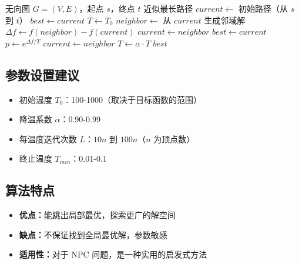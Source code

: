 \documentclass[UTF8,12pt,a4paper]{ctexart}
\begin{document}
\begin{algorithm}[H]
	\caption{模拟退火求解最长路径}
	\begin{algorithmic}[1]
		\Require 无向图 $G=(V,E)$，起点 $s$，终点 $t$
		\Ensure 近似最长路径
		\State $current \gets$ 初始路径（从 $s$ 到 $t$）
		\State $best \gets current$
		\State $T \gets T_0$ 
			 
				\State $neighbor \gets$ 从 $current$ 生成邻域解
					\State $\Delta f \gets f(neighbor) - f(current)$
					 
						\State $current \gets neighbor$
							\State $best \gets current$
						\EndIf
					\Else {}
						\State $p \gets e^{\Delta f / T}$
						 
							\State $current \gets neighbor$
						\EndIf
					\EndIf
				\EndIf
			\EndFor
			\State $T \gets \alpha \cdot T$ 
		\EndWhile
		\State \Return $best$
	\end{algorithmic}
\end{algorithm}

\subsection*{参数设置建议}

\begin{itemize}
	\item 初始温度 $T_0$：100-1000（取决于目标函数的范围）
	\item 降温系数 $\alpha$：0.90-0.99
	\item 每温度迭代次数 $L$：$10n$ 到 $100n$（$n$ 为顶点数）
	\item 终止温度 $T_{min}$：0.01-0.1
\end{itemize}

\subsection*{算法特点}

\begin{itemize}
	\item \textbf{优点：}能跳出局部最优，探索更广的解空间
	\item \textbf{缺点：}不保证找到全局最优解，参数敏感
	\item \textbf{适用性：}对于 NPC 问题，是一种实用的启发式方法
\end{itemize}
\end{document}
